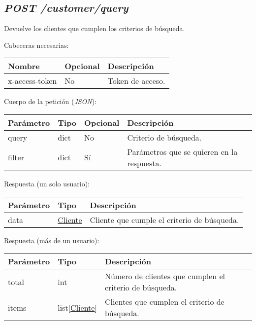 \subsection{\textit{POST /customer/query}}
Devuelve los clientes que cumplen los criterios de búsqueda.

Cabeceras necesarias:
\begin{table}[h!]
	\centering
	\begin{adjustbox}{max width=\textwidth}
	\begin{tabular}{|l|l|l|}
		\hline
		Nombre & Opcional & Descripción \\ \hline
		x-access-token & No & Token de acceso. \\ \hline
	\end{tabular}
\end{adjustbox}
\end{table}

Cuerpo de la petición (\textit{JSON}):
\begin{table}[h!]
	\centering
	\begin{adjustbox}{max width=\textwidth}
	\begin{tabular}{|l|l|l|l|}
		\hline
		Parámetro & Tipo & Opcional & Descripción \\ \hline
		query & dict & No & Criterio de búsqueda. \\ \hline
		filter & dict & Sí & Parámetros que se quieren en la respuesta. \\ \hline
	\end{tabular}
\end{adjustbox}
\end{table}

Respuesta (un solo usuario):
\begin{table}[h!]
	\centering
	
	\begin{adjustbox}{max width=\textwidth}
	\begin{tabular}{|l|l|l|}
		\hline
		Parámetro & Tipo & Descripción \\ \hline
		data & \hyperref[sec:cliente]{Cliente} & Cliente que cumple el criterio de búsqueda. \\ \hline
	\end{tabular}
\end{adjustbox}
\end{table}

Respuesta (más de un usuario):
\begin{table}[h!]
	\centering
	\begin{adjustbox}{max width=\textwidth}
	\begin{tabularx}{\linewidth}{|l|l|L|}
		\hline
		Parámetro & Tipo & Descripción \\ \hline
		total & int & Número de clientes que cumplen el criterio de búsqueda. \\ \hline
		items & list[\hyperref[sec:cliente]{Cliente}] & Clientes que cumplen el criterio de búsqueda. \\ \hline
	\end{tabularx}
\end{adjustbox}
\end{table}



